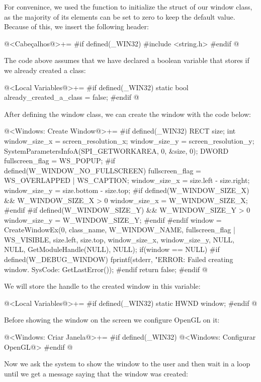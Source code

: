 For convenince, we used the function  to initialize
the struct of our window class, as the majority of its elements can be
set to zero to keep the default value. Because of this, we insert the
following header:

\iniciocodigo
@<Cabeçalhos@>+=
#if defined(_WIN32)
#include <string.h>
#endif
@
\fimcodigo

The code above assumes that we have declared a boolean variable that
stores if we already created a class:

\iniciocodigo
@<Local Variables@>+=
#if defined(_WIN32)
static bool already_created_a_class = false;
#endif
@
\fimcodigo

After defining the window class, we can create the window with the
code below:

\iniciocodigo
@<Windows: Create Window@>+=
#if defined(_WIN32)
{
  RECT size;
  int window_size_x = screen_resolution_x;
  window_size_y = screen_resolution_y;
  SystemParametersInfoA(SPI_GETWORKAREA, 0, &size, 0);
  DWORD fullscreen_flag = WS_POPUP;
#if defined(W_WINDOW_NO_FULLSCREEN)
  fullscreen_flag = WS_OVERLAPPED | WS_CAPTION;
  window_size_x = size.left - size.right;
  window_size_y = size.bottom - size.top;
#if defined(W_WINDOW_SIZE_X) && W_WINDOW_SIZE_X > 0
  window_size_x = W_WINDOW_SIZE_X;
#endif
#if defined(W_WINDOW_SIZE_Y) && W_WINDOW_SIZE_Y > 0
  window_size_y = W_WINDOW_SIZE_Y;
#endif
#endif
  window = CreateWindowEx(0, class_name,
                          W_WINDOW_NAME,
                          fullscreen_flag | WS_VISIBLE,
                          size.left, size.top, window_size_x,
                          window_size_y,
                          NULL, NULL,
                          GetModuleHandle(NULL),
                          NULL);
  if(window == NULL){
#if defined(W_DEBUG_WINDOW)
    fprintf(stderr, "ERROR: Failed creating window. SysCode: %
            GetLastError());
#endif
    return false;
  }
}
#endif
@
\fimcodigo

We will store the handle to the created window in this variable:

\iniciocodigo
@<Local Variables@>+=
#if defined(_WIN32)
static HWND window;
#endif
@
\fimcodigo

Before showing the window on the screen we configure OpenGL on it:

\iniciocodigo
@<Windows: Criar Janela@>+=
#if defined(_WIN32)
@<Windows: Configurar OpenGL@>
#endif
@
\fimcodigo

Now we ask the system to show the window to the user and then wait in
a loop until we get a message saying that the window was created:

